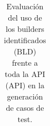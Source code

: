 \begin{table}[t!]
\begin{tabular}{ c l c c}
\end{tabular}%

\caption{Evaluación del uso de los builders identificados (BLD) frente a toda la API (API) en la generación de casos de test.}
\label{tab:results-obj}
\end{table}